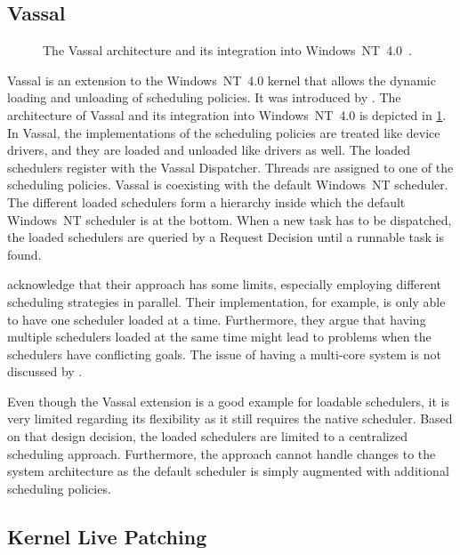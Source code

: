 \subsection{Vassal}

\begin{figure}[b!]\centering
	\caption[The Vassal architecture and its integration into Windows~NT~4.0.]{The Vassal architecture and its integration into Windows~NT~4.0~\cite[6]{Candea-1998-Vassal}.}%
	\label{fig:related:vassal}
\end{figure}

Vassal is an extension to the Windows~NT~4.0 kernel that allows the dynamic loading and unloading of scheduling policies. It was introduced by \textcite{Candea-1998-Vassal}. The architecture of Vassal and its integration into Windows~NT~4.0 is depicted in \cref{fig:related:vassal}. In Vassal, the implementations of the scheduling policies are treated like device drivers, and they are loaded and unloaded like drivers as well. The loaded schedulers register with the Vassal Dispatcher. Threads are assigned to one of the scheduling policies. Vassal is coexisting with the default Windows~NT scheduler. The different loaded schedulers form a hierarchy inside which the default Windows~NT scheduler is at the bottom. When a new task has to be dispatched, the loaded schedulers are queried by a Request Decision until a runnable task is found.

 acknowledge that their approach has some limits, especially employing different scheduling strategies in parallel. Their implementation, for example, is only able to have one scheduler loaded at a time. Furthermore, they argue that having multiple schedulers loaded at the same time might lead to problems when the schedulers have conflicting goals. The issue of having a multi-core system is not discussed by .

Even though the Vassal extension is a good example for loadable schedulers, it is very limited regarding its flexibility as it still requires the native scheduler. Based on that design decision, the loaded schedulers are limited to a centralized scheduling approach. Furthermore, the approach cannot handle changes to the system architecture as the default scheduler is simply augmented with additional scheduling policies.

\subsection{Kernel Live Patching}%
\label{sec:related:patching}

